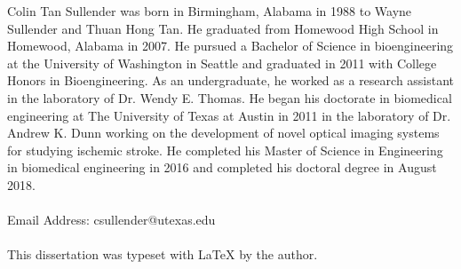 \documentclass[12pt]{report}
\begin{document}








\begin{vita}
Colin Tan Sullender was born in Birmingham, Alabama in 1988 to Wayne Sullender and Thuan Hong Tan. He graduated from Homewood High School in Homewood, Alabama in 2007. He pursued a Bachelor of Science in bioengineering at the University of Washington in Seattle and graduated in 2011 with College Honors in Bioengineering. As an undergraduate, he worked as a research assistant in the laboratory of Dr. Wendy E. Thomas. He began his doctorate in biomedical engineering at The University of Texas at Austin in 2011 in the laboratory of Dr. Andrew K. Dunn working on the development of novel optical imaging systems for studying ischemic stroke. He completed his Master of Science in Engineering in biomedical engineering in 2016 and completed his doctoral degree in August 2018.
\\
\\
Email Address: csullender@utexas.edu
\\
\\
This dissertation was typeset with \LaTeX{} by the author.
\end{vita}


\end{document}
